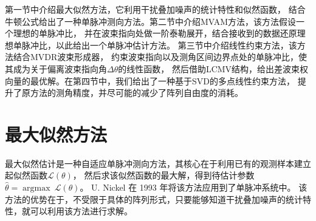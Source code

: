 \documentclass[master]{thesis-uestc}
\begin{document}
第一节中介绍最大似然方法，它利用干扰叠加噪声的统计特性和似然函数，
结合牛顿公式给出了一种单脉冲测向方法。第二节中介绍MVAM方法，该方法假设一个理想的单脉冲比，
并在波束指向处做一阶泰勒展开，结合接收到的数据还原理想单脉冲比，以此给出一个单脉冲估计方法。
第三节中介绍线性约束方法，该方法结合MVDR波束形成器，
约束波束指向以及测角区间边界点处的单脉冲比，使其成为关于偏离波束指向角$\Delta\theta$的线性函数，
然后借助LCMV结构，给出差波束权向量的最优解。在第四节中，我们给出了一种基于SVD的多点线性约束方法，
提升了原方法的测角精度，并尽可能的减少了阵列自由度的消耗。

\section{最大似然方法}
最大似然估计是一种自适应单脉冲测向方法，其核心在于利用已有的观测样本建立起似然函数$\mathcal{L}(\theta)$，
然后求该似然函数的最大解，得到待估计参数$\hat{\theta}=\operatorname{argmax}~\mathcal{L}(\theta)$。
U. Nickel 在 1993 年将该方法应用到了单脉冲系统中。
该方法的优势在于，不受限于具体的阵列形式，只要能够知道干扰叠加噪声的统计特性，就可以利用该方法进行求解。
\end{document}
